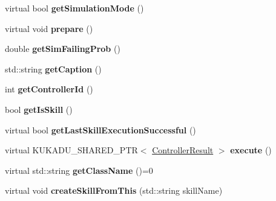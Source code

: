 \begin{DoxyCompactItemize}
\item 
virtual bool {\bfseries get\+Simulation\+Mode} ()\hypertarget{classkukadu_1_1Controller_a868b762c6bf33afe14c27dd12806972d}{}\label{classkukadu_1_1Controller_a868b762c6bf33afe14c27dd12806972d}

\item 
virtual void {\bfseries prepare} ()\hypertarget{classkukadu_1_1Controller_a12aafcec427d197314434f04f5ae438c}{}\label{classkukadu_1_1Controller_a12aafcec427d197314434f04f5ae438c}

\item 
double {\bfseries get\+Sim\+Failing\+Prob} ()\hypertarget{classkukadu_1_1Controller_a97ffde82f967a920ddc5efb1c5700b2a}{}\label{classkukadu_1_1Controller_a97ffde82f967a920ddc5efb1c5700b2a}

\item 
std\+::string {\bfseries get\+Caption} ()\hypertarget{classkukadu_1_1Controller_aae1903e89a3af93030bd85cb6baac366}{}\label{classkukadu_1_1Controller_aae1903e89a3af93030bd85cb6baac366}

\item 
int {\bfseries get\+Controller\+Id} ()\hypertarget{classkukadu_1_1Controller_a72d9fb0bcdfd41faf8b1277802df4a1d}{}\label{classkukadu_1_1Controller_a72d9fb0bcdfd41faf8b1277802df4a1d}

\item 
bool {\bfseries get\+Is\+Skill} ()\hypertarget{classkukadu_1_1Controller_a6a78436c180e48afbf6887fcd07d3173}{}\label{classkukadu_1_1Controller_a6a78436c180e48afbf6887fcd07d3173}

\item 
virtual bool {\bfseries get\+Last\+Skill\+Execution\+Successful} ()\hypertarget{classkukadu_1_1Controller_aeb403995b4bfc9f279594ff339027cbf}{}\label{classkukadu_1_1Controller_aeb403995b4bfc9f279594ff339027cbf}

\item 
virtual K\+U\+K\+A\+D\+U\+\_\+\+S\+H\+A\+R\+E\+D\+\_\+\+P\+TR$<$ \hyperlink{classkukadu_1_1ControllerResult}{Controller\+Result} $>$ {\bfseries execute} ()\hypertarget{classkukadu_1_1Controller_a07b38b6146b380471de2c0e0706e9260}{}\label{classkukadu_1_1Controller_a07b38b6146b380471de2c0e0706e9260}

\item 
virtual std\+::string {\bfseries get\+Class\+Name} ()=0\hypertarget{classkukadu_1_1Controller_aaad4258aa03d4f941cdf8e5d9400212b}{}\label{classkukadu_1_1Controller_aaad4258aa03d4f941cdf8e5d9400212b}

\item 
virtual void {\bfseries create\+Skill\+From\+This} (std\+::string skill\+Name)\hypertarget{classkukadu_1_1Controller_a7925a80f7f1a69302633606ba6a73c34}{}\label{classkukadu_1_1Controller_a7925a80f7f1a69302633606ba6a73c34}

\end{DoxyCompactItemize}

